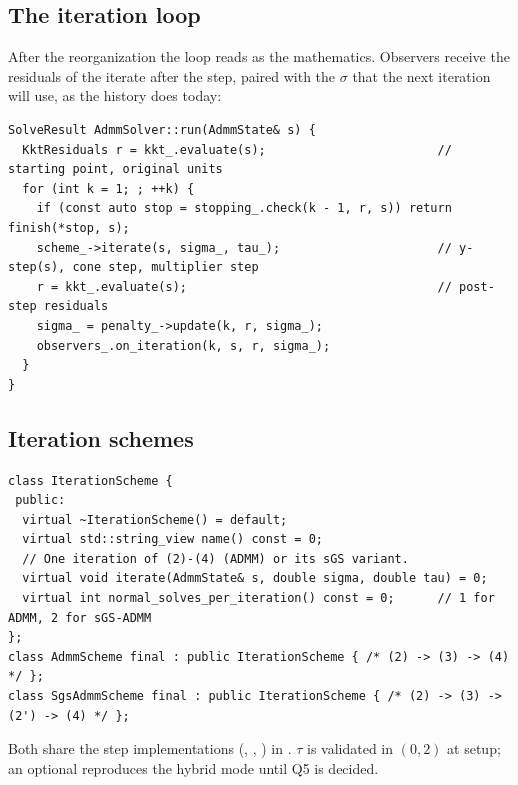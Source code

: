 \documentclass[11pt]{article}
\begin{document}
\subsection{The iteration loop}
After the reorganization the loop reads as the mathematics. Observers receive the residuals of the
iterate after the step, paired with the $\sigma$ that the next iteration will use, as the history does
today:
\begin{lstlisting}
SolveResult AdmmSolver::run(AdmmState& s) {
  KktResiduals r = kkt_.evaluate(s);                        // starting point, original units
  for (int k = 1; ; ++k) {
    if (const auto stop = stopping_.check(k - 1, r, s)) return finish(*stop, s);
    scheme_->iterate(s, sigma_, tau_);                      // y-step(s), cone step, multiplier step
    r = kkt_.evaluate(s);                                   // post-step residuals
    sigma_ = penalty_->update(k, r, sigma_);
    observers_.on_iteration(k, s, r, sigma_);
  }
}
\end{lstlisting}

\subsection{Iteration schemes}
\begin{lstlisting}
class IterationScheme {
 public:
  virtual ~IterationScheme() = default;
  virtual std::string_view name() const = 0;
  // One iteration of (2)-(4) (ADMM) or its sGS variant.
  virtual void iterate(AdmmState& s, double sigma, double tau) = 0;
  virtual int normal_solves_per_iteration() const = 0;      // 1 for ADMM, 2 for sGS-ADMM
};
class AdmmScheme final : public IterationScheme { /* (2) -> (3) -> (4) */ };
class SgsAdmmScheme final : public IterationScheme { /* (2) -> (3) -> (2') -> (4) */ };
\end{lstlisting}
Both share the step implementations (, , ) in
. $\tau$ is validated in $(0,2)$ at setup; an optional 
reproduces the hybrid mode until Q5 is decided.
\end{document}
